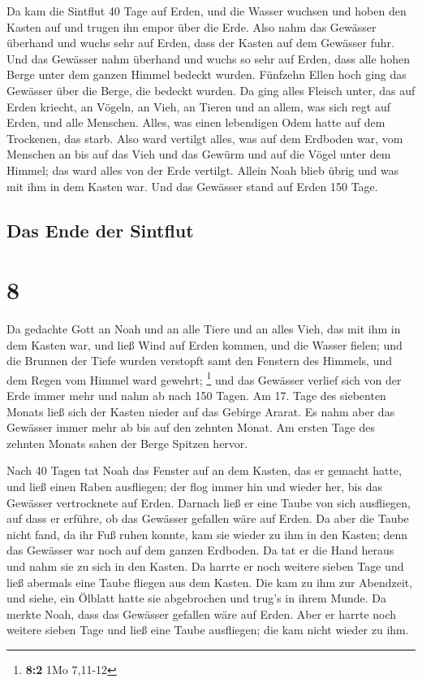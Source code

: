  Da kam die Sintflut 40 Tage auf Erden, und die Wasser
wuchsen und hoben den Kasten auf und trugen ihn empor über die Erde.
 Also nahm das Gewässer überhand und wuchs sehr auf
Erden, dass der Kasten auf dem Gewässer fuhr.  Und das
Gewässer nahm überhand und wuchs so sehr auf Erden, dass alle hohen
Berge unter dem ganzen Himmel bedeckt wurden.  Fünfzehn
Ellen hoch ging das Gewässer über die Berge, die bedeckt wurden.
 Da ging alles Fleisch unter, das auf Erden kriecht, an
Vögeln, an Vieh, an Tieren und an allem, was sich regt auf Erden, und
alle Menschen.  Alles, was einen lebendigen Odem hatte
auf dem Trockenen, das starb.  Also ward vertilgt alles,
was auf dem Erdboden war, vom Menschen an bis auf das Vieh und das
Gewürm und auf die Vögel unter dem Himmel; das ward alles von der Erde
vertilgt. Allein Noah blieb übrig und was mit ihm in dem Kasten war.
 Und das Gewässer stand auf Erden 150 Tage.

\hypertarget{das-ende-der-sintflut}{%
\subsection{Das Ende der Sintflut}\label{das-ende-der-sintflut}}

\hypertarget{section-7}{%
\section{8}\label{section-7}}

 Da gedachte Gott an Noah und an alle Tiere und an alles
Vieh, das mit ihm in dem Kasten war, und ließ Wind auf Erden kommen, und
die Wasser fielen;  und die Brunnen der Tiefe wurden
verstopft samt den Fenstern des Himmels, und dem Regen vom Himmel ward
gewehrt; \footnote{\textbf{8:2} 1Mo 7,11-12}  und das
Gewässer verlief sich von der Erde immer mehr und nahm ab nach 150
Tagen.  Am 17. Tage des siebenten Monats ließ sich der
Kasten nieder auf das Gebirge Ararat.  Es nahm aber das
Gewässer immer mehr ab bis auf den zehnten Monat. Am ersten Tage des
zehnten Monats sahen der Berge Spitzen hervor.

 Nach 40 Tagen tat Noah das Fenster auf an dem Kasten, das
er gemacht hatte,  und ließ einen Raben ausfliegen; der
flog immer hin und wieder her, bis das Gewässer vertrocknete auf Erden.
 Darnach ließ er eine Taube von sich ausfliegen, auf dass
er erführe, ob das Gewässer gefallen wäre auf Erden.  Da
aber die Taube nicht fand, da ihr Fuß ruhen konnte, kam sie wieder zu
ihm in den Kasten; denn das Gewässer war noch auf dem ganzen Erdboden.
Da tat er die Hand heraus und nahm sie zu sich in den Kasten.
 Da harrte er noch weitere sieben Tage und ließ abermals
eine Taube fliegen aus dem Kasten.  Die kam zu ihm zur
Abendzeit, und siehe, ein Ölblatt hatte sie abgebrochen und trug's in
ihrem Munde. Da merkte Noah, dass das Gewässer gefallen wäre auf Erden.
 Aber er harrte noch weitere sieben Tage und ließ eine
Taube ausfliegen; die kam nicht wieder zu ihm.

